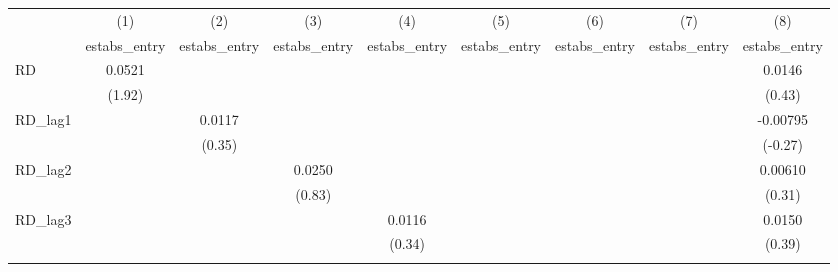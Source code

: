 {
\def\sym#1{\ifmmode^{#1}\else\(^{#1}\)\fi}
\begin{tabular}{l*{8}{c}}
\toprule
            &\multicolumn{1}{c}{(1)}&\multicolumn{1}{c}{(2)}&\multicolumn{1}{c}{(3)}&\multicolumn{1}{c}{(4)}&\multicolumn{1}{c}{(5)}&\multicolumn{1}{c}{(6)}&\multicolumn{1}{c}{(7)}&\multicolumn{1}{c}{(8)}\\
            &\multicolumn{1}{c}{estabs\_entry}&\multicolumn{1}{c}{estabs\_entry}&\multicolumn{1}{c}{estabs\_entry}&\multicolumn{1}{c}{estabs\_entry}&\multicolumn{1}{c}{estabs\_entry}&\multicolumn{1}{c}{estabs\_entry}&\multicolumn{1}{c}{estabs\_entry}&\multicolumn{1}{c}{estabs\_entry}\\
\midrule
RD          &      0.0521         &                     &                     &                     &                     &                     &                     &      0.0146         \\
            &      (1.92)         &                     &                     &                     &                     &                     &                     &      (0.43)         \\
\addlinespace
RD\_lag1     &                     &      0.0117         &                     &                     &                     &                     &                     &    -0.00795         \\
            &                     &      (0.35)         &                     &                     &                     &                     &                     &     (-0.27)         \\
\addlinespace
RD\_lag2     &                     &                     &      0.0250         &                     &                     &                     &                     &     0.00610         \\
            &                     &                     &      (0.83)         &                     &                     &                     &                     &      (0.31)         \\
\addlinespace
RD\_lag3     &                     &                     &                     &      0.0116         &                     &                     &                     &      0.0150         \\
            &                     &                     &                     &      (0.34)         &                     &                     &                     &      (0.39)         \\
\addlinespace

\end{tabular}}
